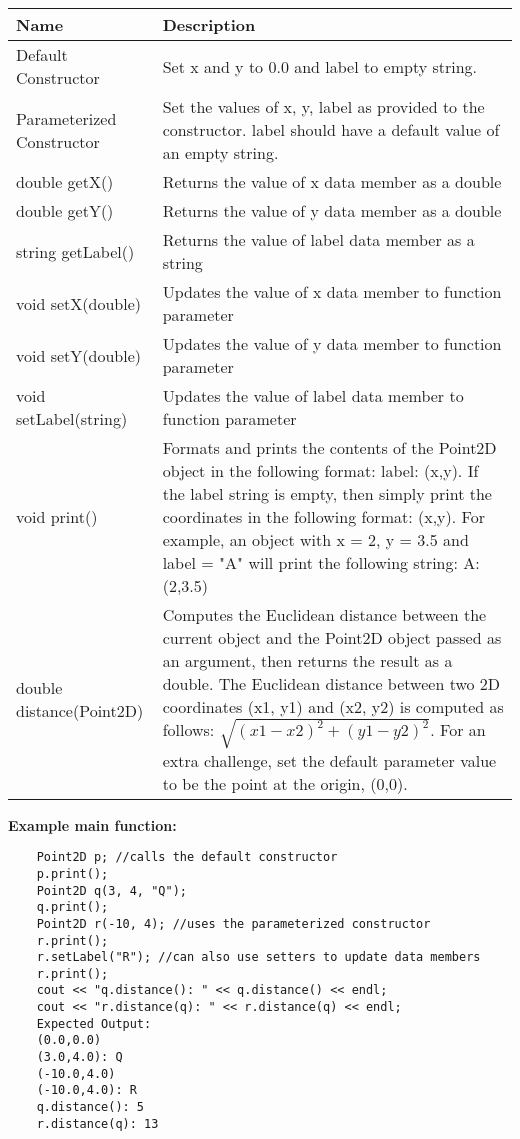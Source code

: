 \begin{table}[H]
    \centering
    \begin{tabular}{|p{3in}|p{3in}|}
        \hline
        \textbf{Name} & \textbf{Description} \\ 
        \hline
        Default Constructor & Set x and y to 0.0 and label to empty string. \\ 
        \hline
        Parameterized Constructor & Set the values of x, y, label as provided to the constructor. label should have a default value of an empty string. \\ 
        \hline
        double getX() & Returns the value of x data member as a double \\ 
        \hline
        double getY() & Returns the value of y data member as a double \\ 
        \hline
        string getLabel() & Returns the value of label data member as a string \\ 
        \hline
        void setX(double) & Updates the value of x data member to function parameter \\ 
        \hline
        void setY(double) & Updates the value of y data member to function parameter \\ 
        \hline
        void setLabel(string) & Updates the value of label data member to function parameter \\ 
        \hline
        void print() & Formats and prints the contents of the Point2D object in the following format: label: (x,y). If the label string is empty, then simply print the coordinates in the following format: (x,y). For example, an object with x = 2, y = 3.5 and label = "A" will print the following string: A: (2,3.5) \\ 
        \hline
        double distance(Point2D) & Computes the Euclidean distance between the current object and the Point2D object passed as an argument, then returns the result as a double. The Euclidean distance between two 2D coordinates (x1, y1) and (x2, y2) is computed as follows: $\sqrt{(x1 - x2)^2 + (y1 - y2)^2}$. For an extra challenge, set the default parameter value to be the point at the origin, (0,0). \\ 
        \hline
    \end{tabular}

\end{table}


\textbf{Example main function:}
\begin{verbatim}
    Point2D p; //calls the default constructor
    p.print();
    Point2D q(3, 4, "Q");
    q.print();
    Point2D r(-10, 4); //uses the parameterized constructor
    r.print();
    r.setLabel("R"); //can also use setters to update data members
    r.print();
    cout << "q.distance(): " << q.distance() << endl;
    cout << "r.distance(q): " << r.distance(q) << endl;
    Expected Output:
    (0.0,0.0)
    (3.0,4.0): Q
    (-10.0,4.0)
    (-10.0,4.0): R
    q.distance(): 5
    r.distance(q): 13
\end{verbatim}


